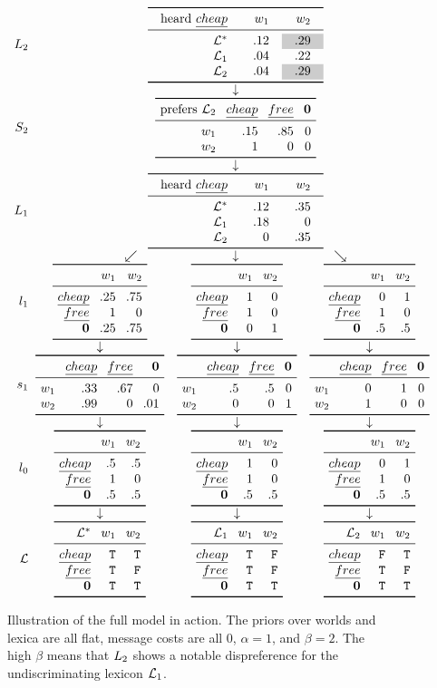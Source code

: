 \documentclass[12pt,twoside]{article}
\renewcommand{\_}{\textbf{\textunderscore\hspace{-4pt}\textunderscore\hspace{-3pt}\textunderscore\hspace{-4pt}\textunderscore}\hspace{0.5pt}}			%
\begin{document}
\begin{figure}[htp]
  \centering
  \renewcommand{\arraystretch}{0.9}

  \newcommand{\singlearrowdivider}{& \multicolumn{3}{c}{\downarrow}}
  \newcommand{\straightarrowdivider}{& \downarrow & \downarrow & \downarrow}
  \newcommand{\angledarrowdivider}{& \multicolumn{3}{c}{\swarrow \hspace{75pt} \downarrow\hspace{75pt} \searrow}}

  \setlength{\arraycolsep}{12pt}
  $\begin{array}[c]{r@{\mspace{10mu}}c c c}
  \ListenerK[2] & \multicolumn{3}{c}{\examplejoint{\text{heard }\word{cheap}}{.12 & \graycell{.29}}{.04 & .22}{.04 & \graycell{.29}}}
  \\
  \singlearrowdivider
  \\
  \SpeakerK[2] & \multicolumn{3}{c}{\exampleSpeaker{\text{prefers } \Lex_{2}}{.15 & .85 & 0}{1 & 0 & 0}}
  \\
  \singlearrowdivider
  \\
  \ListenerK[1] & \multicolumn{3}{c}{\examplejoint{\text{heard }\word{cheap}}{.12 & .35}{.18 & 0}{0 & .35}}
  \\
  \angledarrowdivider
  \\
  \listenerOne & \examplelistener{.25 & .75}{1 & 0}{.25 & .75} & \examplelistener{1 & 0}{1 & 0}{0 & 1} & \examplelistener{0 & 1}{1 & 0}{.5 & .5}
  \\
  \straightarrowdivider
  \\
  \speakerOne & \examplespeaker{.33 & .67 & 0}{.99 & 0 & .01} & \examplespeaker{.5 & .5 & 0}{0 & 0 & 1} & \examplespeaker{0 & 1 & 0}{1 & 0 & 0}
  \\
  \straightarrowdivider
  \\
  \listenerZero & \examplelistener{.5 & .5}{1 & 0}{.5 & .5} & \examplelistener{1 & 0}{1 & 0}{.5 & .5} & \examplelistener{0 & 1}{1 & 0}{.5 & .5}
  \\
  \straightarrowdivider
  \\
  \Lex & \examplelex[\LexStar]{\True & \True}  & \examplelex[\Lex_{1}]{\True & \False} & \examplelex[\Lex_{2}]{\False & \True}
  \end{array}$                                                                                          
  \caption{Illustration of the full model in action. 
    The priors over worlds and lexica are all flat, 
    message costs are all $0$,
    $\alpha=1$, and 
    $\beta=2$. 
    The high $\beta$ means that $\ListenerK[2]$ shows a notable dispreference for the undiscriminating lexicon $\Lex_{1}$.}
  \label{fig:simple-example}
\end{figure}
\end{document}
